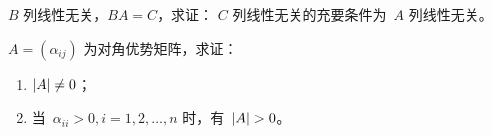 \documentclass[twoside,openright]{book}
\begin{document}
\begin{CJK*}{UTF8}{}
\begin{quest}
\label{quest:155}
$B$ 列线性无关，$BA=C$，求证：
$C$ 列线性无关的充要条件为\ $A$ 列线性无关。
\end{quest}

\begin{quest}
\label{quest:156}
$A=(\alpha_{ij})$ 为对角优势矩阵，求证：
\begin{enumerate}
\item
$\lvert{A}\rvert\neq0$；
\item
当\ $\alpha_{ii}>0,i=1,2,\dotsc,n$ 时，有\ $\lvert{A}\rvert>0$。
\end{enumerate}
\end{quest}

\begin{quest}
\label{quest:157}
\end{quest}

\begin{quest}
\label{quest:158}
\end{quest}

\begin{quest}
\label{quest:159}
\end{quest}

\begin{quest}
\label{quest:160}
\end{quest}

\begin{quest}
\label{quest:161}
\end{quest}

\begin{quest}
\label{quest:162}
\end{quest}

\begin{quest}
\label{quest:163}
\end{quest}

\begin{quest}
\label{quest:164}
\end{quest}

\begin{quest}
\label{quest:165}
\end{quest}

\begin{quest}
\label{quest:166}
\end{quest}


\backmatter




\newpage
\end{CJK*}
\end{document}
